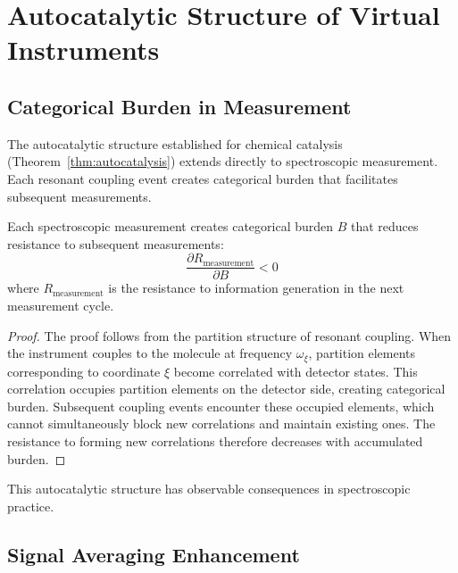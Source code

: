 \section{Autocatalytic Structure of Virtual Instruments}
\label{sec:autocatalytic}

\subsection{Categorical Burden in Measurement}

The autocatalytic structure established for chemical catalysis (Theorem~\ref{thm:autocatalysis}) extends directly to spectroscopic measurement. Each resonant coupling event creates categorical burden that facilitates subsequent measurements.

\begin{theorem}
\label{thm:measurement_autocatalysis}
Each spectroscopic measurement creates categorical burden $B$ that reduces resistance to subsequent measurements:
\begin{equation}
\frac{\partial R_{\mathrm{measurement}}}{\partial B} < 0
\end{equation}
where $R_{\mathrm{measurement}}$ is the resistance to information generation in the next measurement cycle.
\end{theorem}

\begin{proof}
The proof follows from the partition structure of resonant coupling. When the instrument couples to the molecule at frequency $\omega_\xi$, partition elements corresponding to coordinate $\xi$ become correlated with detector states. This correlation occupies partition elements on the detector side, creating categorical burden. Subsequent coupling events encounter these occupied elements, which cannot simultaneously block new correlations and maintain existing ones. The resistance to forming new correlations therefore decreases with accumulated burden.
\end{proof}

This autocatalytic structure has observable consequences in spectroscopic practice.

\subsection{Signal Averaging Enhancement}

